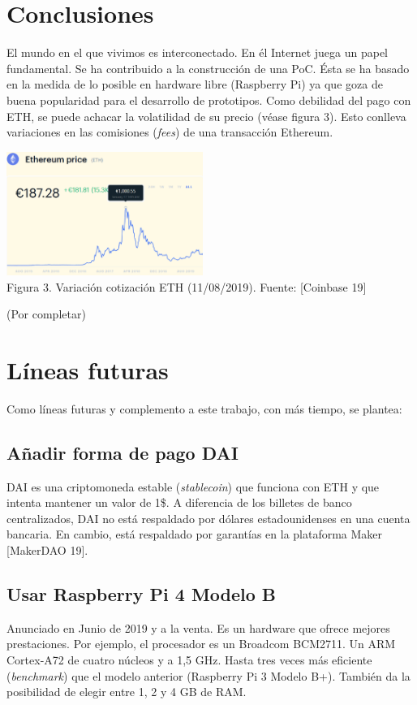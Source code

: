 \documentclass[12pt]{amsart}
\begin{document}
\begin{multicols}{2}
\section{Conclusiones}\label{sec:conclusions}
El mundo en el que vivimos es interconectado.
En él Internet juega un papel fundamental.
Se ha contribuido a la construcción de
una PoC. Ésta se ha basado en la medida de
lo posible en hardware libre
(Raspberry Pi) ya que goza de buena popularidad
para el desarrollo de prototipos.
Como debilidad del pago con ETH, se puede
achacar la volatilidad de su precio (véase figura 3).
Esto conlleva variaciones en
las comisiones (\textit{fees}) de una transacción Ethereum.
\begin{center}
  \includegraphics[keepaspectratio, width=0.481125\textwidth]{images/ethcurrentprice-sourcecoinbase.eps}
\\
Figura 3. Variación cotización ETH (11/08/2019). Fuente: [Coinbase 19]
\\
\end{center}
(Por completar)
\section{Líneas futuras}\label{sec:future}
Como líneas futuras y complemento a este trabajo, con más tiempo, se plantea:
\subsection{Añadir forma de pago DAI} \label{ch:dai}
DAI es una criptomoneda estable (\textit{stablecoin}) que funciona con ETH y que intenta mantener un valor de 1\$. A diferencia de los billetes de banco centralizados, DAI no está respaldado por dólares estadounidenses en una cuenta bancaria. En cambio, está respaldado por garantías en la plataforma Maker [MakerDAO 19].
\subsection{Usar Raspberry Pi 4 Modelo B} \label{ch:rpi4modelb}
Anunciado en Junio de 2019 y a la venta. Es un hardware que ofrece mejores prestaciones. Por ejemplo, el procesador es un Broadcom BCM2711. Un ARM Cortex-A72 de cuatro núcleos y a 1,5 GHz. Hasta tres veces más eficiente (\textit{benchmark}) que el modelo anterior (Raspberry Pi 3 Modelo B+). También da la posibilidad de elegir entre 1, 2 y 4 GB de RAM.

\end{multicols}
\end{document}
